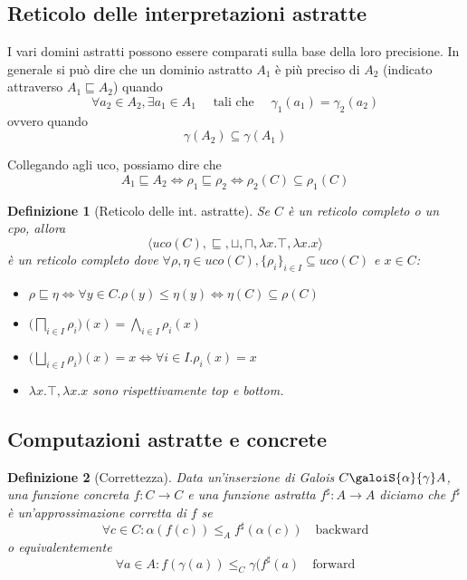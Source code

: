 \documentclass{article}
\newtheorem{definit}{Definizione}[subsection]
\begin{document}
        \subsection{Reticolo delle interpretazioni astratte}
            I vari domini astratti possono essere comparati sulla base della loro precisione. In generale si può dire che un dominio astratto $A_1$ è più preciso di $A_2$ (indicato attraverso $A_1 \sqsubseteq A_2$) quando \[ \forall a_2 \in A_2, \exists a_1 \in A_1 \quad \text{ tali che } \quad \gamma_1(a_1) = \gamma_2(a_2) \] ovvero quando \[ \gamma(A_2) \subseteq \gamma(A_1) \]
            
            Collegando agli uco, possiamo dire che \[ A_1 \sqsubseteq A_2 \Leftrightarrow \rho_1 \sqsubseteq \rho_2 \Leftrightarrow \rho_2(C) \subseteq \rho_1(C) \]
            
            \begin{definit}[Reticolo delle int. astratte]
                Se $C$ è un reticolo completo o un cpo, allora \[ \langle uco(C), \sqsubseteq, \sqcup, \sqcap, \lambda x.\top, \lambda x.x \rangle \] è un reticolo completo dove $\forall \rho, \eta \in uco(C), \{ \rho_i \}_{i \in I} \subseteq uco(C)$ e $x \in C$:\begin{itemize}
                    \item $\rho \sqsubseteq \eta \Leftrightarrow \forall y \in C.\rho(y) \leq \eta(y) \Leftrightarrow \eta(C) \subseteq \rho(C)$
                    
                    \item $ \displaystyle \Big( \bigsqcap_{i \in I} \rho_i \Big)(x) = \bigwedge_{i \in I} \rho_i(x)$
                    
                    \item $ \displaystyle \Big( \bigsqcup_{i \in I} \rho_i \Big)(x) = x \Leftrightarrow \forall i \in I. \rho_i(x)=x$
                    
                    \item $\lambda x.\top, \lambda x.x$ sono rispettivamente top e bottom. 
                \end{itemize}
            \end{definit}

        \subsection{Computazioni astratte e concrete}
            \begin{definit}[Correttezza]
                Data un'inserzione di Galois $C \galoiS{\alpha}{\gamma} A$, una funzione concreta $f: C \to C$ e una funzione astratta $f^\sharp: A \to A$ diciamo che $f^\sharp$ è un'approssimazione corretta di $f$ se \[ \forall c \in C: \alpha(f(c)) \leq_A f^\sharp(\alpha(c)) \quad \text{backward} \] o equivalentemente \[ \forall a \in A: f(\gamma(a)) \leq_C \gamma(f^\sharp(a) \quad \text{forward} \]
            \end{definit}
            
\end{document}
